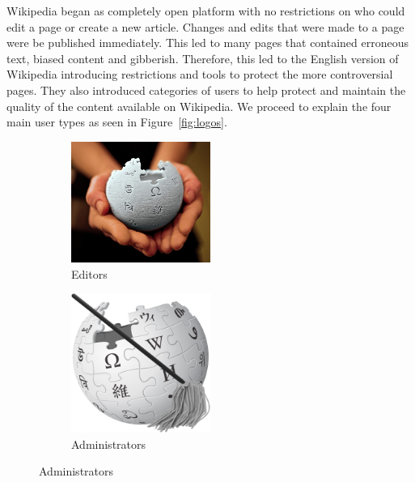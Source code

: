Wikipedia began as completely open platform with no restrictions on who could edit a page or create a new article.
Changes and edits that were made to a page were be published immediately.
This led to many pages that contained erroneous text, biased content and gibberish.
Therefore, this led to the English version of Wikipedia introducing restrictions and tools to protect the more controversial pages.
They also introduced categories of users to help protect and maintain the quality of the content available on Wikipedia.
We proceed to explain the four main user types as seen in Figure~\ref{fig:logos}. 
\begin{figure}[h!]
    \centering
    \begin{subfigure}[b]{0.49\textwidth}
        \centering
        \includegraphics[width=0.5\textwidth]{images/wikipedians.jpg}
        \caption{Editors}
        \label{fig:editors}
    \end{subfigure}
    \begin{subfigure}[b]{0.49\textwidth}
        \centering
        \includegraphics[width=0.5\textwidth]{images/admins.png}
        \caption{Administrators}
        \label{fig:admins}
    \end{subfigure}


\end{figure}
